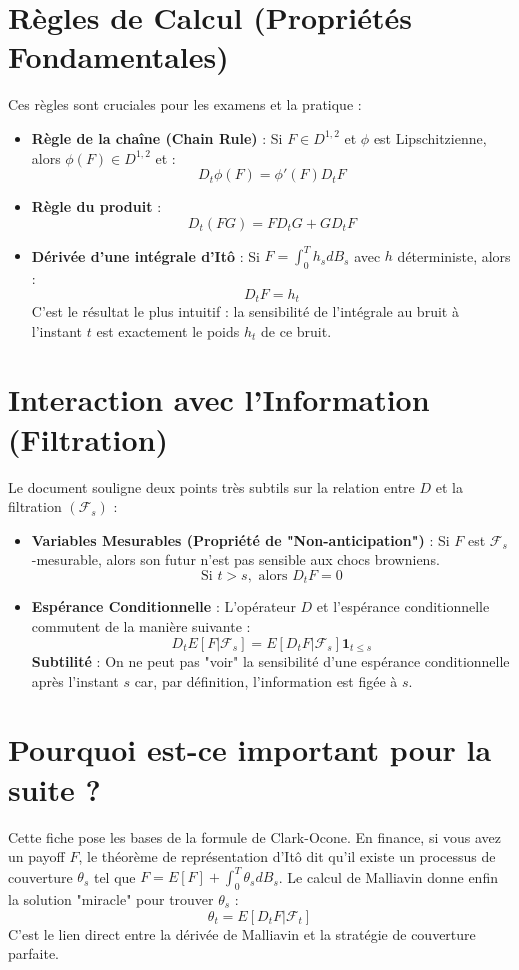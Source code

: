 \documentclass{article}
\begin{document}
\section{Règles de Calcul (Propriétés Fondamentales)}
Ces règles sont cruciales pour les examens et la pratique :

\begin{itemize}
    \item \textbf{Règle de la chaîne (Chain Rule)} : Si $F \in D^{1,2}$ et $\phi$ est Lipschitzienne, alors $\phi(F) \in D^{1,2}$ et :
    \[
    D_t \phi(F) = \phi'(F) D_t F
    \]
    \item \textbf{Règle du produit} :
    \[
    D_t (FG) = F D_t G + G D_t F
    \]
    \item \textbf{Dérivée d'une intégrale d'Itô} : Si $F = \int_0^T h_s dB_s$ avec $h$ déterministe, alors :
    \[
    D_t F = h_t
    \]
    C'est le résultat le plus intuitif : la sensibilité de l'intégrale au bruit à l'instant $t$ est exactement le poids $h_t$ de ce bruit.
\end{itemize}

\section{Interaction avec l'Information (Filtration)}
Le document souligne deux points très subtils sur la relation entre $D$ et la filtration $(\mathcal{F}_s)$ :

\begin{itemize}
    \item \textbf{Variables Mesurables (Propriété de "Non-anticipation")} : Si $F$ est $\mathcal{F}_s$-mesurable, alors son futur n'est pas sensible aux chocs browniens.
    \[
    \text{Si } t > s, \text{ alors } D_t F = 0
    \]
    \item \textbf{Espérance Conditionnelle} : L'opérateur $D$ et l'espérance conditionnelle commutent de la manière suivante :
    \[
    D_t E[F | \mathcal{F}_s] = E[D_t F | \mathcal{F}_s] \mathbf{1}_{t \le s}
    \]
    \textbf{Subtilité} : On ne peut pas "voir" la sensibilité d'une espérance conditionnelle après l'instant $s$ car, par définition, l'information est figée à $s$.
\end{itemize}

\section{Pourquoi est-ce important pour la suite ?}
Cette fiche pose les bases de la formule de Clark-Ocone. En finance, si vous avez un payoff $F$, le théorème de représentation d'Itô dit qu'il existe un processus de couverture $\theta_s$ tel que $F = E[F] + \int_0^T \theta_s dB_s$. Le calcul de Malliavin donne enfin la solution "miracle" pour trouver $\theta_s$ :
\[
\theta_t = E[D_t F | \mathcal{F}_t]
\]
C'est le lien direct entre la dérivée de Malliavin et la stratégie de couverture parfaite.
\end{document}
